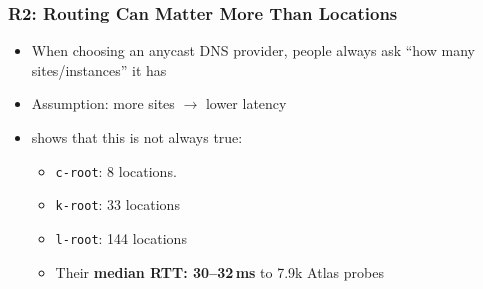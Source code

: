 \documentclass[11pt,show 
notes,notheorems,noamsthm,blank]{beamer} %
\begin{document}
% 
%     
% 
% 
% 
% 
% 
% 
% 
%  


\begin{frame}
 \frametitle{R2: Routing Can Matter More Than Locations}
 
 \begin{itemize}
  \item When choosing an anycast DNS provider, people always ask ``how many 
sites/instances'' it has
 \item Assumption: more sites $\rightarrow$ lower latency
 \item \cite{Schmidt17a} shows that this is not always true:
 
\begin{itemize}
 \item \texttt{c-root}: 8 locations. 
 \item \texttt{k-root}: 33 locations
 \item \texttt{l-root}: 144 locations
 \item Their\textbf{ median RTT: 30--32\,ms }to 7.9k Atlas probes
\end{itemize}


 \end{itemize}

\end{frame}
\end{document}
